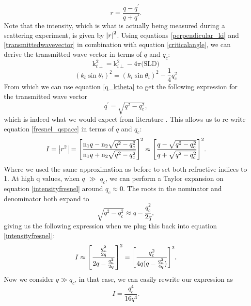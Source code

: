 \begin{equation}\label{fresnel_qspace_no_n}
	r = \frac{q- q^{\prime}}{q+q{\prime}}.
\end{equation}
Note that the intensity, which is what is actually being measured during a scattering experiment, is given by $\abs{r}^2$. Using equations \ref{perpendicular_ki} and \ref{transmittedwavevector} in combination with equation \ref{criticalangle}, we can derive the transmitted wave vector in terms of $q$ and $q_c$:
\begin{equation}
	\textrm{k}^2_{t\perp} = \textrm{k}^2_{i\perp} - 4\pi \textrm{(SLD)}
\end{equation}
\begin{equation}
	(k_t \sin\theta_t)^2 = (k_i \sin\theta_i)^2 - \frac{1}{4}q_c^2
\end{equation}
From which we can use equation \ref{q_ktheta} to get the following expression for the transmitted wave vector
\begin{equation}\label{transmitted_wave}
	q^{\prime} = \sqrt{q^2 - q_c^2},
\end{equation}
which is indeed what we would expect from literature \cite{qc_expression}. This allows us to re-write equation \ref{fresnel_qspace} in terms of $q$ and $q_c$:
\begin{equation}\label{intensityfresnel}
	I = \abs{r^2} = \qty [\frac{\textrm{n}_1 q- \textrm{n}_2\sqrt{ q^2 -  q_c^2}}{ \textrm{n}_1q+ \textrm{n}_2\sqrt{q^2 - q_c^2}}]^2 \approx  \qty [\frac{q- \sqrt{q^2 - q_c^2}}{q+ \sqrt{q^2 - q_c^2}}]^2 .
\end{equation}
Where we used the same approximation as before to set both refractive indices to 1. At high q values, when $q$ $\gg$ $q_c$, we can perform a Taylor expansion on equation \ref{intensityfresnel} around $q_c \approx 0$. The roots in the nominator and denominator both expand to
\begin{equation}
	\sqrt{q^2 - q_c^2} \approx q - \frac{q_c^2}{2q},
\end{equation}
giving us the following expression when we plug this back into equation \ref{intensityfresnel}:
\begin{equation}
	I \approx \qty[\frac{\frac{q_c^2}{2q}}{2q - \frac{q_c^2}{2q}}]^2 = \qty[\frac{q_c^2}{4q(q-\frac{q_c^2}{4q})}]^2.
\end{equation}
Now we consider $q \gg q_c$, in that case, we can easily rewrite our expression as
\begin{equation}
	I = \frac{q_c^4}{16q^4}.
\end{equation}
